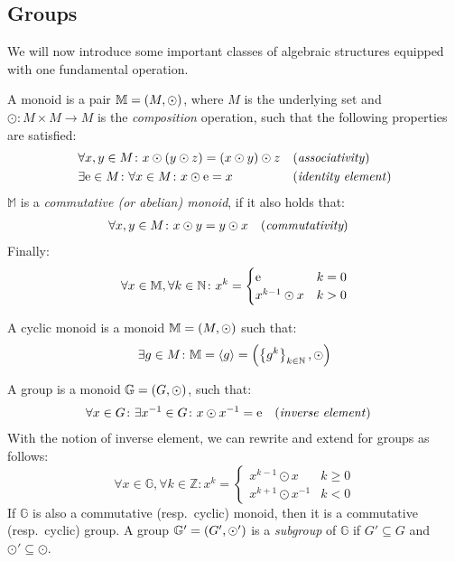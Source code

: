 \subsection{Groups}
We will now introduce some important classes of algebraic structures equipped with one fundamental 
operation. 
\begin{definition}[Monoid]
  A monoid is a pair \(\mathbb{M} = \left(M, \odot\right) \), where \(M\) is the 
  underlying set and \(\odot\colon M \times M \to M\) is the \emph{composition} 
  operation, such that the following properties are satisfied: 
  \begin{align*}
    & \forall x,y \in M\colon x \odot \left(y \odot z\right) = \left(x \odot y\right) \odot z
      && \textnormal{(\emph{associativity})} \\
    & \exists \mathrm{e} \in M\colon \forall x \in M\colon x \odot \mathrm{e} = x
      && \textnormal{(\emph{identity element})}
  \end{align*}
  \(\mathbb{M}\) is a \emph{commutative (or abelian) monoid}, if it also holds that:
  \begin{align*}
    & \forall x,y \in M\colon x \odot y = y \odot x && (\emph{commutativity})
  \end{align*}
  Finally:
  \begin{equation}\label{eq:exponentiation}    
    \forall x \in \mathbb{M}, \forall k \in \mathbb{N}\colon x^{k} = 
    \begin{cases}
      \mathrm{e} & k = 0 \\
      x^{k-1} \odot x & k > 0
    \end{cases}
  \end{equation}
\end{definition}

\begin{definition}
  A cyclic monoid is a monoid \(\mathbb{M} = \left(M, \odot\right)\) such that:
  \[\exists g \in M\colon \mathbb{M} = \left\langle g\right\rangle = 
  \left(\left\{g^k\right\}_{k \in \mathbb{N}}, \odot\right) \]  
\end{definition}

\begin{definition}[Group]
  A group is a monoid \(\mathbb{G} = \left(G, \odot\right) \), such that: 
  \begin{align*}    
    & \forall x \in G\colon \exists x^{-1} \in G\colon x \odot x^{-1} = \mathrm{e}
    && \textnormal{(\emph{inverse element})}
  \end{align*}
  With the notion of inverse element, we can rewrite and extend  
  for groups as follows:
  \[
    \forall x \in \mathbb{G},\forall k \in \mathbb{Z}\colon x^k =
    \begin{cases}
      x^{k-1} \odot x & k \ge 0 \\
      x^{k+1} \odot x^{-1} & k < 0
    \end{cases}
  \]
  If \(\mathbb{G}\) is also a commutative (resp.\ cyclic) monoid, then it is a 
  commutative (resp.\ cyclic) group.
  A group \(\mathbb{G}' = \left(G', \odot'\right)\) is a \emph{subgroup} of \(\mathbb{G}\) if 
  \(G' \subseteq G\) and \(\odot' \subseteq \odot \).
\end{definition}


